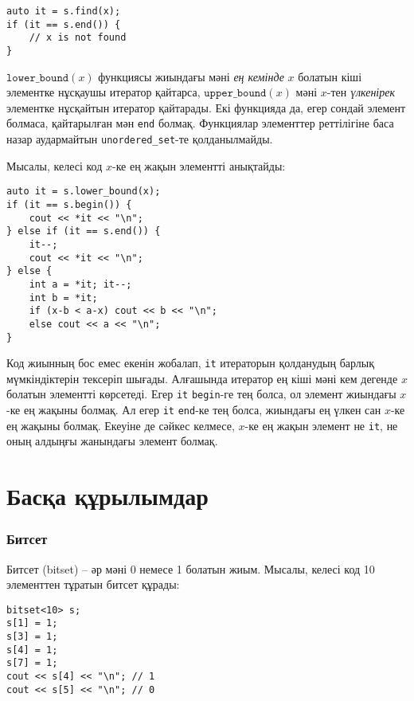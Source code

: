 \begin{lstlisting}
auto it = s.find(x);
if (it == s.end()) {
    // x is not found
}
\end{lstlisting}

$\texttt{lower\_bound}(x)$ функциясы жиындағы мәні \emph{ең кемінде} 
$x$ болатын кіші элементке нұсқаушы итератор қайтарса, $\texttt{upper\_bound}(x)$ 
мәні $x$-тен \emph{үлкенірек} элементке нұсқайтын итератор қайтарады.
Екі функцияда да, егер сондай элемент болмаса, қайтарылған мән \texttt{end} болмақ.
Функциялар элементтер реттілігіне баса назар аудармайтын \texttt{unordered\_set}-те
қолданылмайды.

\begin{samepage}
Мысалы, келесі код $x$-ке ең жақын элементті анықтайды:

\begin{lstlisting}
auto it = s.lower_bound(x);
if (it == s.begin()) {
    cout << *it << "\n";
} else if (it == s.end()) {
    it--;
    cout << *it << "\n";
} else {
    int a = *it; it--;
    int b = *it;
    if (x-b < a-x) cout << b << "\n";
    else cout << a << "\n";
}
\end{lstlisting}

Код жиынның бос емес екенін жобалап, 
\texttt{it} итераторын қолданудың барлық мүмкіндіктерін тексеріп шығады.
Алғашында итератор ең кіші мәні кем дегенде 
$x$ болатын элементті көрсетеді.
Егер \texttt{it} \texttt{begin}-ге тең болса,
ол элемент жиындағы $x$-ке ең жақыны болмақ.
Ал егер \texttt{it} \texttt{end}-ке тең болса,
жиындағы ең үлкен сан $x$-ке ең жақыны болмақ.
Екеуіне де сәйкес келмесе, $x$-ке ең жақын элемент
не \texttt{it}, не оның алдыңғы жанындағы элемент болмақ.
\end{samepage}

\section{Басқа құрылымдар}

\subsubsection{Битсет}


Битсет (bitset) -- әр мәні 0 немесе 1 болатын жиым.
Мысалы, келесі код 10 элементтен тұратын битсет құрады:
\begin{lstlisting}
bitset<10> s;
s[1] = 1;
s[3] = 1;
s[4] = 1;
s[7] = 1;
cout << s[4] << "\n"; // 1
cout << s[5] << "\n"; // 0
\end{lstlisting}

